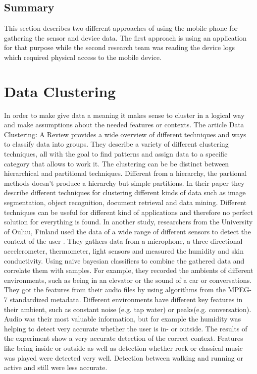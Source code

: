 \subsection{Summary} 
This section describes two different approaches of using the mobile phone for gathering the sensor and device data. The first approach is using an application for that purpose while the second research team was reading the device logs which required physical access to the mobile device.


\section{Data Clustering}
In order to make give data a meaning it makes sense to cluster in a logical way and make assumptions about the needed features or contexts. 
The article Data Clustering: A Review \cite{jain1999data} provides a wide overview of different techniques and ways to classify data into groups. They describe a variety of different clustering techniques, all with the goal to find patterns and assign data to a specific category that allows to work it. The clustering can be be distinct between hierarchical and partitional techniques. Different from a hierarchy, the partional methods doesn't produce a hierarchy but simple partitions. In their paper they describe different techniques for clustering different kinds of data such as image segmentation, object recognition, document retrieval and data mining. Different techniques can be useful for different kind of applications and therefore no perfect solution for everything is found. 
In another study, researchers from the University of Ouluu, Finland used the data of a wide range of different sensors to detect the context of the user \cite{korpipaa2003bayesian}. They gathers data from a microphone, a three directional accelerometer, thermometer, light sensors and measured the humidity and skin conductivity. 
Using naive bayesian classifiers to combine the gathered data and correlate them with samples. For example, they recorded the ambients of different environments, such as being in an elevator or the sound of a car or conversations. They got the features from their audio files by using algorithms from the MPEG-7 standardized metadata. Different environments have different key features in their ambient, such as constant noise (e.g. tap water) or peaks(e.g. conversation).
Audio was their most valuable information, but for example the humidity was helping to detect very accurate whether the user is in- or outside.
The results of the experiment show a very accurate detection of the correct context. Features like being inside or outside as well as detection whether rock or classical music was played were detected very well. Detection between walking and running or active and still were less accurate.
